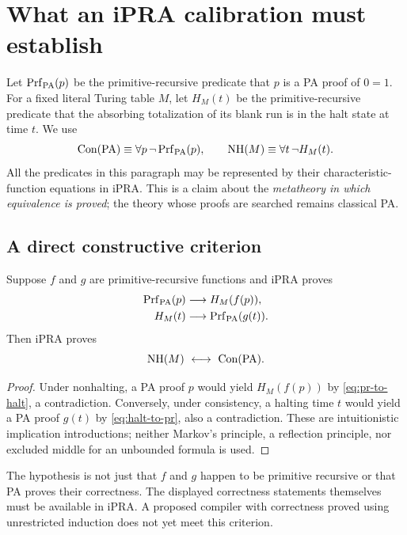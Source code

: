 \section{What an iPRA calibration must establish}
\label{sec:ipra-audit}

Let $\operatorname{Prf}_{\rm PA}(p)$ be the primitive-recursive predicate
that $p$ is a PA proof of $0=1$.  For a fixed literal Turing table $M$,
let $H_M(t)$ be the primitive-recursive predicate that the absorbing
totalization of its blank run is in the halt state at time $t$.  We use
\[
  \operatorname{Con}({\rm PA})\equiv
       \forall p\,\neg\operatorname{Prf}_{\rm PA}(p),\qquad
  \operatorname{NH}(M)\equiv\forall t\,\neg H_M(t).
\]
All the predicates in this paragraph may be represented by their
characteristic-function equations in iPRA.  This is a claim about the
\emph{metatheory in which equivalence is proved}; the theory whose proofs
are searched remains classical PA.

\subsection{A direct constructive criterion}

\begin{proposition}
Suppose $f$ and $g$ are primitive-recursive functions and iPRA proves
\begin{align}
 \operatorname{Prf}_{\rm PA}(p)&\longrightarrow H_M(f(p)),
       \label{eq:pr-to-halt}\\
 H_M(t)&\longrightarrow\operatorname{Prf}_{\rm PA}(g(t)).
       \label{eq:halt-to-pr}
\end{align}
Then iPRA proves
\[
 \operatorname{NH}(M)\ \longleftrightarrow\ \operatorname{Con}({\rm PA}).
\]
\end{proposition}
\begin{proof}
Under nonhalting, a PA proof $p$ would yield $H_M(f(p))$ by
\eqref{eq:pr-to-halt}, a contradiction.  Conversely, under consistency,
a halting time $t$ would yield a PA proof $g(t)$ by
\eqref{eq:halt-to-pr}, also a contradiction.  These are intuitionistic
implication introductions; neither Markov's principle, a reflection
principle, nor excluded middle for an unbounded formula is used.
\end{proof}

The hypothesis is not just that $f$ and $g$ happen to be primitive
recursive or that PA proves their correctness.  The displayed correctness
statements themselves must be available in iPRA.  A proposed compiler
with correctness proved using unrestricted induction does not yet meet
this criterion.

